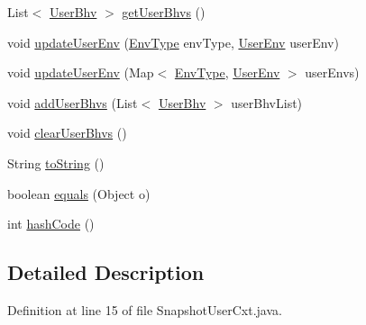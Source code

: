 \begin{DoxyCompactItemize}
\item 
\-List$<$ \hyperlink{interfacelab_1_1davidahn_1_1appshuttle_1_1collect_1_1bhv_1_1_user_bhv}{\-User\-Bhv} $>$ \hyperlink{classlab_1_1davidahn_1_1appshuttle_1_1collect_1_1_snapshot_user_cxt_a5de5da219f0eee9b192950f5cb70a9c9}{get\-User\-Bhvs} ()
\item 
void \hyperlink{classlab_1_1davidahn_1_1appshuttle_1_1collect_1_1_snapshot_user_cxt_aa86b6be20bbd33762118da99edfd093f}{update\-User\-Env} (\hyperlink{enumlab_1_1davidahn_1_1appshuttle_1_1collect_1_1env_1_1_env_type}{\-Env\-Type} env\-Type, \hyperlink{classlab_1_1davidahn_1_1appshuttle_1_1collect_1_1env_1_1_user_env}{\-User\-Env} user\-Env)
\item 
void \hyperlink{classlab_1_1davidahn_1_1appshuttle_1_1collect_1_1_snapshot_user_cxt_aad7b547e523c3f9f39d13d1ed540cf90}{update\-User\-Env} (\-Map$<$ \hyperlink{enumlab_1_1davidahn_1_1appshuttle_1_1collect_1_1env_1_1_env_type}{\-Env\-Type}, \hyperlink{classlab_1_1davidahn_1_1appshuttle_1_1collect_1_1env_1_1_user_env}{\-User\-Env} $>$ user\-Envs)
\item 
void \hyperlink{classlab_1_1davidahn_1_1appshuttle_1_1collect_1_1_snapshot_user_cxt_a6a5ba8ab65907f930479cd1316c4a831}{add\-User\-Bhvs} (\-List$<$ \hyperlink{interfacelab_1_1davidahn_1_1appshuttle_1_1collect_1_1bhv_1_1_user_bhv}{\-User\-Bhv} $>$ user\-Bhv\-List)
\item 
void \hyperlink{classlab_1_1davidahn_1_1appshuttle_1_1collect_1_1_snapshot_user_cxt_ad66e9a6eff99d36e5e51d29358db578f}{clear\-User\-Bhvs} ()
\item 
\-String \hyperlink{classlab_1_1davidahn_1_1appshuttle_1_1collect_1_1_snapshot_user_cxt_a639cd7643f9ce0453852b1328d60ca25}{to\-String} ()
\item 
boolean \hyperlink{classlab_1_1davidahn_1_1appshuttle_1_1collect_1_1_snapshot_user_cxt_afcb0d2eccecaf97c6ff04ecc2dd64cb2}{equals} (\-Object o)
\item 
int \hyperlink{classlab_1_1davidahn_1_1appshuttle_1_1collect_1_1_snapshot_user_cxt_ac277966f61c0e087879cddb3e6512a25}{hash\-Code} ()
\end{DoxyCompactItemize}


\subsection{\-Detailed \-Description}


\-Definition at line 15 of file \-Snapshot\-User\-Cxt.\-java.



